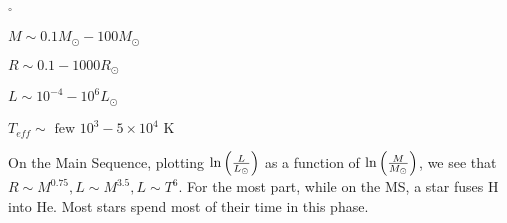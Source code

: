 \begin{list}{$^\circ$}{}
\item$M \sim 0.1M_\odot - 100M_\odot$
\item $R \sim 0.1 - 1000R_\odot$
\item $L \sim 10^{-4} - 10^6 L_\odot$
\item $T_{eff} \sim \textrm{ few } 10^3 - 5 \times 10^4 \textrm{ K}$
\end{list}

On the Main Sequence, plotting $\ln \left( \frac{L}{L_\odot} \right)$ as a function of  $\ln \left( \frac{M}{M_\odot} \right)$, we see that $R \sim M^{0.75}, L \sim M^{3.5}, L\sim T^6$. For the most part, while on the MS, a star fuses H into He. Most stars spend most of their time in this phase. 
